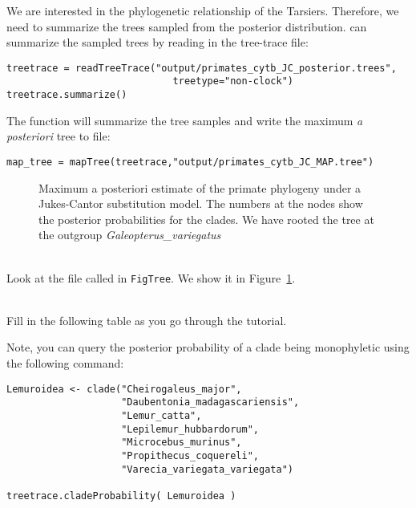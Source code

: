 We are interested in the phylogenetic relationship of the Tarsiers. Therefore, we need to summarize the trees sampled from the posterior distribution.
\RevBayes can summarize the sampled trees by reading in the tree-trace file:
{\tt \begin{snugshade*}
\begin{lstlisting}
treetrace = readTreeTrace("output/primates_cytb_JC_posterior.trees",
                             treetype="non-clock")
treetrace.summarize()
\end{lstlisting}
\end{snugshade*}}
The  function will summarize the tree samples and write the maximum \textit{a posteriori} tree to file:
{\tt \begin{snugshade*}
\begin{lstlisting}
map_tree = mapTree(treetrace,"output/primates_cytb_JC_MAP.tree")
\end{lstlisting}
\end{snugshade*}}
\begin{figure}[htbp!]
\centering
{}
\caption{\small Maximum a posteriori estimate of the primate phylogeny under a Jukes-Cantor substitution model. 
The numbers at the nodes show the posterior probabilities for the clades.
We have rooted the tree at the outgroup \emph{Galeopterus\_variegatus}}
\label{fig:jc_tree}
\end{figure}
\noindent \\ \impmark Look at the file called  in \texttt{FigTree}. We show it in Figure~\ref{fig:jc_tree}.


\noindent \\ \impmark Fill in the following table as you go through the tutorial.

Note, you can query the posterior probability of a clade being monophyletic using the following command:
{\tt \begin{snugshade*}
\begin{lstlisting}
Lemuroidea <- clade("Cheirogaleus_major", 
                    "Daubentonia_madagascariensis", 
                    "Lemur_catta", 
                    "Lepilemur_hubbardorum",
                    "Microcebus_murinus",
                    "Propithecus_coquereli",
                    "Varecia_variegata_variegata")
                    
treetrace.cladeProbability( Lemuroidea )
\end{lstlisting}
\end{snugshade*}}

